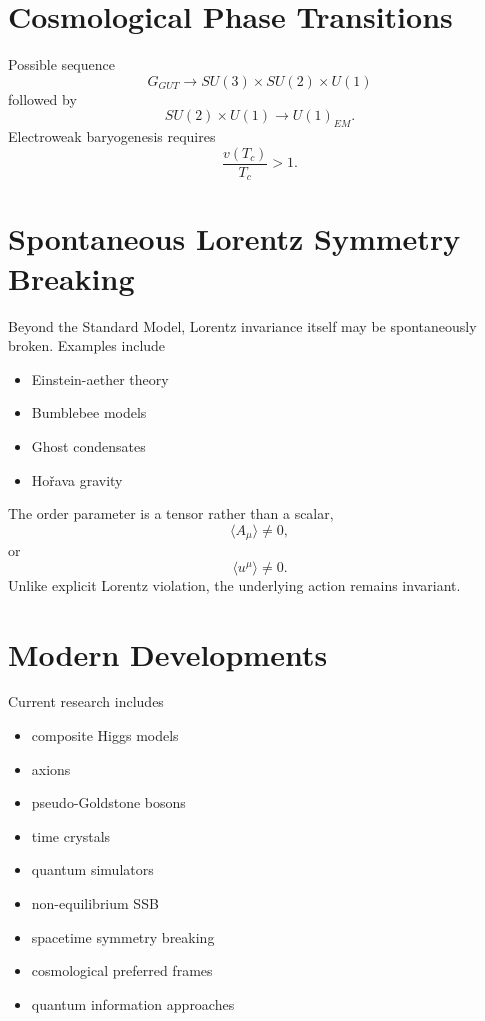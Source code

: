 \documentclass[11pt,a4paper]{article}
\begin{document}
\section{Cosmological Phase Transitions}
Possible sequence
\[
G_{GUT}
\rightarrow
SU(3)\times SU(2)\times U(1)
\]
followed by
\[
SU(2)\times U(1)
\rightarrow
U(1)_{EM}.
\]
Electroweak baryogenesis requires
\[
\frac{v(T_c)}{T_c}>1.
\]
\section{Spontaneous Lorentz Symmetry Breaking}
Beyond the Standard Model,
Lorentz invariance itself may be spontaneously broken.
Examples include
\begin{itemize}
\item Einstein-aether theory
\item Bumblebee models
\item Ghost condensates
\item Ho\v rava gravity
\end{itemize}
The order parameter is a tensor rather than a scalar,
\[
\langle A_\mu\rangle
\neq
0,
\]
or
\[
\langle u^\mu\rangle
\neq
0.
\]
Unlike explicit Lorentz violation, the underlying action remains invariant.
\section{Modern Developments}
Current research includes
\begin{itemize}
\item composite Higgs models
\item axions
\item pseudo-Goldstone bosons
\item time crystals
\item quantum simulators
\item non-equilibrium SSB
\item spacetime symmetry breaking
\item cosmological preferred frames
\item quantum information approaches
\end{itemize}
\end{document}
